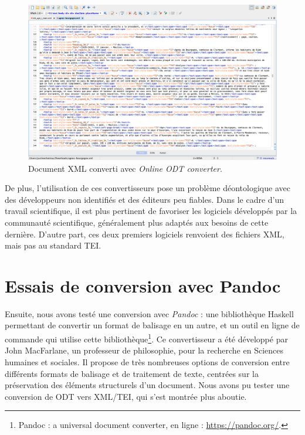\begin{figure}[H]
    \centering
    \includegraphics[scale=0.31]{front/images/onlineconvertfree.png}
    \caption{Document XML converti avec \textit{Online ODT converter}.}
    \label{fig:online_odt_converter}
\end{figure}

\par De plus, l’utilisation de ces convertisseurs pose un problème déontologique avec des développeurs non identifiés et des éditeurs peu fiables. Dans le cadre d’un travail scientifique, il est plus pertinent de favoriser les logiciels développés par la communauté scientifique, généralement plus adaptés aux besoins de cette dernière. D'autre part, ces deux premiers logiciels renvoient des fichiers XML, mais pas au standard TEI.

\newpage 

\section{Essais de conversion avec Pandoc}
\label{II.4.2}

\par Ensuite, nous avons testé une conversion avec \textit{Pandoc} : une bibliothèque Haskell permettant de convertir un format de balisage en un autre, et un outil en ligne de commande qui utilise cette bibliothèque\footnote{Pandoc : a universal document converter, en ligne : \url{https://pandoc.org/}.}. Ce convertisseur a été développé par John MacFarlane, un professeur de philosophie, pour la recherche en Sciences humaines et sociales. Il propose de très nombreuses options de conversion entre différents formats de balisage et de traitement de texte, centrées sur la préservation des éléments structurels d’un document. Nous avons pu tester une conversion de ODT vers XML/TEI, qui s’est montrée plus aboutie. 

